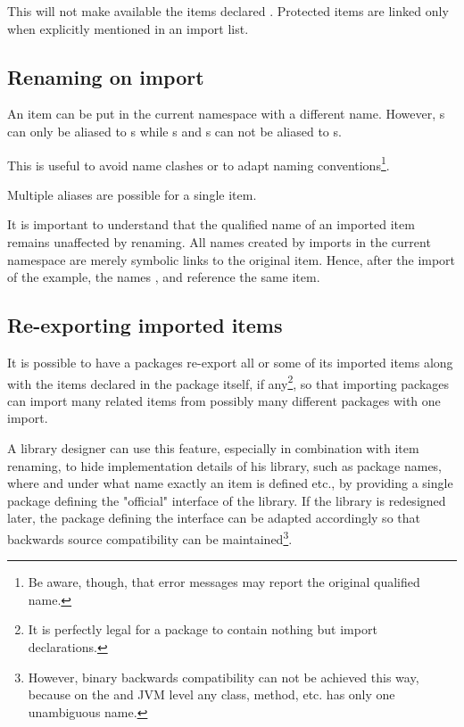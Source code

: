 This will not make available the items declared . 
Protected items are linked only when explicitly mentioned in an import list.


\subsection{Renaming on import} \label{renameitem}

An item can be put in the current namespace with a different name. However, s can only be aliased to s while s and s can not be aliased to s.

This is useful to avoid name clashes or to adapt naming conventions\footnote{
Be aware, though, that error messages may report the original qualified name.}.

Multiple aliases are possible for a single item.


It is important to understand that the qualified name of an imported item remains unaffected by renaming. 
All names created by imports in the current namespace are merely symbolic links to the original item. 
Hence, after the import of the example, the names ,  and  reference the same item. 

\subsection{Re-exporting imported items} \label{reexport}

It is possible to have a packages re-export all or some of its imported items 
along with the items declared in the package itself, if any\footnote{
It is perfectly legal for a package to contain nothing but import declarations.}, 
so that importing  packages can import many related items from possibly many different packages with one import.

A library designer can use this feature, especially in combination with item renaming, 
to hide implementation details of his library, 
such as package names, where and under what name exactly an item is defined etc.,
by providing a single package defining the "official" interface of the library. 
If the library is redesigned later, the package defining the interface can be adapted accordingly 
so that backwards source compatibility can be maintained\footnote{
However, binary backwards compatibility can not be achieved this way, because on the \java{} and JVM level any class,
method, etc. has only one unambiguous name.}.

